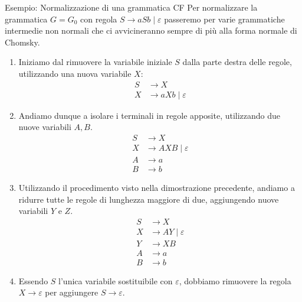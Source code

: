 \begin{generalbox}[colframe=azure-gradient-3!90!black]{Esempio: Normalizzazione di una grammatica CF}
  Per normalizzare la grammatica $G=G_0$ con regola $S \to aSb \mid \varepsilon$ passeremo per varie grammatiche intermedie non normali che ci avvicineranno sempre di più alla forma normale di Chomsky.

  \bigskip

  \begin{enumerate}
    \item[$G_1$]

      Iniziamo dal rimuovere la variabile iniziale $S$ dalla parte destra delle regole, utilizzando una nuova variabile $X$:
      \begin{equation}
        \begin{split}
          S &\to X \\
          X &\to aXb \mid \varepsilon
        \end{split}
      \end{equation}
    \item[$G_2$]
      Andiamo dunque a isolare i terminali in regole apposite, utilizzando due nuove variabili $A,B$.
      \begin{equation}
        \begin{split}
          S &\to X \\
          X &\to AXB \mid \varepsilon \\
          A &\to a \\
          B &\to b
        \end{split}
      \end{equation}
    \item[$G_3$]
      Utilizzando il procedimento visto nella dimostrazione precedente, andiamo a ridurre tutte le regole di lunghezza maggiore di due, aggiungendo nuove variabili $Y$ e $Z$.
      \begin{equation}
        \begin{split}
          S &\to X \\
          X &\to AY \mid \varepsilon \\
          Y &\to XB \\
          A &\to a \\
          B &\to b
        \end{split}
      \end{equation}
    \item[$G_4$]
      Essendo $S$ l'unica variabile sostituibile con $\varepsilon$, dobbiamo rimuovere la regola $X \to \varepsilon$ per aggiungere $S \to \varepsilon$.


\end{enumerate}
\end{generalbox}
